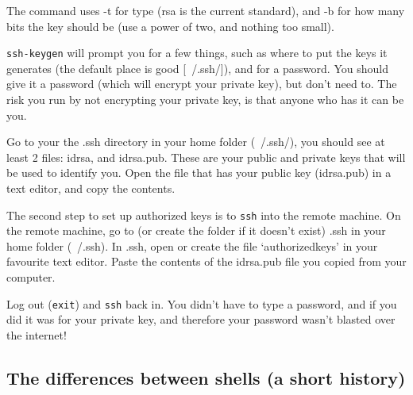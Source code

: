 The command uses -t for type (rsa 
is the current standard), and -b for how 
many bits the key should be (use a power of two, and nothing too small).

{\tt ssh-keygen} will prompt you for a few things, such as where to put the
keys it generates (the default place is good [~/.ssh/]), and for a password.
You should give it a password (which will encrypt your private key), but don't need to. 
The risk you run by not encrypting your private key, is that anyone who has it
can be you.

Go to your the .ssh directory in your home folder (~/.ssh/), you should see at 
least 2 files: id\textunderscore rsa, and id\textunderscore rsa.pub. These are your public and private keys
that will be used to identify you.  Open the file that has your public key (id\textunderscore rsa.pub)
in a text editor, and copy the contents.

The second step to set up authorized keys is to {\tt ssh} into the remote machine.
On the remote machine, go to (or create the folder if it doesn't exist) .ssh 
in your home folder (~/.ssh). In .ssh, open or create the file `authorized\textunderscore keys'
in your favourite text editor.
Paste the contents of the id\textunderscore rsa.pub file you copied from your computer.

Log out ({\tt exit}) and {\tt ssh} back in. You didn't have to type a password, and
if you did it was for your private key, and therefore your password wasn't blasted
over the internet!

\subsection{The differences between shells (a short history)}




